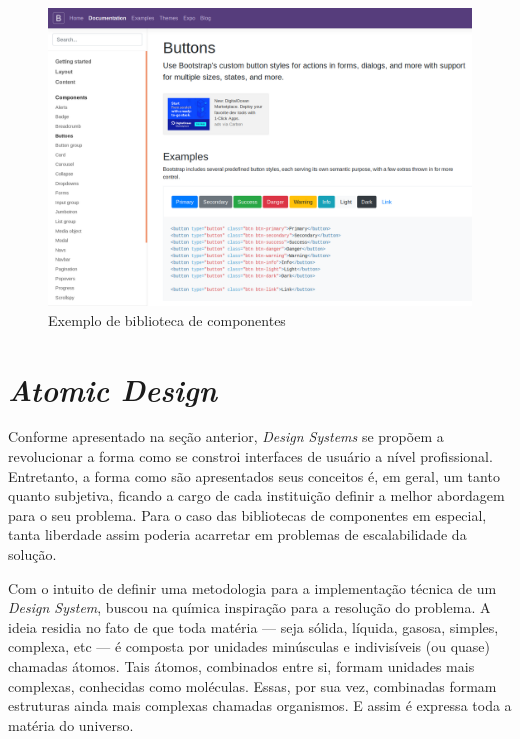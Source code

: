 \begin{figure}
	\includegraphics[width=\linewidth]{./04-figuras/02_referencial_teorico/bootstrap.png}
	\caption{Exemplo de biblioteca de componentes}
  \label{fig:bootstrapStyleGuide}
\end{figure}

\section{\textit{Atomic Design}}
\label{sec:atomicDesign}

Conforme apresentado na seção anterior, \textit{Design Systems} se propõem a revolucionar a forma como se constroi interfaces de usuário a nível profissional. Entretanto, a forma como são apresentados seus conceitos é, em geral, um tanto quanto subjetiva, ficando a cargo de cada instituição definir a melhor abordagem para o seu problema. Para o caso das bibliotecas de componentes em especial, tanta liberdade assim poderia acarretar em problemas de escalabilidade da solução.

Com o intuito de definir uma metodologia para a implementação técnica de um \textit{Design System}, \cite{frostAtomicDesign} buscou na química inspiração para a resolução do problema. A ideia residia no fato de que toda matéria --- seja sólida, líquida, gasosa, simples, complexa, etc --- é composta por unidades minúsculas e indivisíveis (ou quase) chamadas átomos. Tais átomos, combinados entre si, formam unidades mais complexas, conhecidas como moléculas. Essas, por sua vez, combinadas formam estruturas ainda mais complexas chamadas organismos. E assim é expressa toda a matéria do universo.

